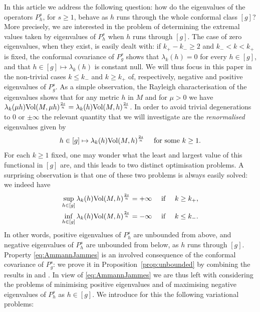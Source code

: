 \documentclass[10pt]{amsart}
\numberwithin{equation}{section}
\def\la{{\lambda}}
\def\Vol{{\mathop{\rm Vol}}}
\theoremstyle{plain}
\theoremstyle{remark}
\begin{document}
\medskip

In this article we address the following question: how do the eigenvalues of the operators $P_h^s$, for $s \ge 1$, behave as $h$ runs through the whole conformal class $[g]$? More precisely, we are interested in the problem of determining the extremal values taken by eigenvalues of $P_h^s$ when $h$ runs through  $[g]$. The case of zero eigenvalues, when they exist, is easily dealt with: if $k_+ - k_- \ge 2$ and $k_- <k < k_+ $ is fixed, the conformal covariance of $P_g^s$ shows that $\lambda_k(h) = 0$ for every $h \in [g]$, and that $h \in [g] \mapsto \lambda_k(h)$ is constant null. We will thus focus in this paper in the non-trivial cases $k \le k_-$ and $k \ge k_+$ of, respectively, negative and positive eigenvalues of $P_g^s$.  As a simple observation, the Rayleigh characterisation of the eigenvalues shows that for any metric $h$ in $M$ and for $\mu >0$ we have $ \la_k(\mu h) \Vol(M,\mu h)^{\frac{2s}{n}} = \la_k(h) \Vol(M, h)^{\frac{2s}{n}}$. In order to avoid trivial degenerations to $0$ or $\pm \infty$ the relevant quantity that we will investigate are the \emph{renormalised} eigenvalues given by
 $$h \in [g] \mapsto \la_k(h) \Vol(M,h)^{\frac{2s}{n}} \quad \text{ for some }  k \ge 1. $$ 
For each $k \ge 1$ fixed, one may wonder what the least and largest value of this functional in $[g]$ are, and this leads to two distinct optimisation problems. A surprising observation is that one of these two problems is always easily solved: we indeed have
\begin{equation} \label{eq:AmmannJammes}
 \begin{aligned}
                            \sup_{h \in [g]} \la_k(h) \Vol(M,h)^{\frac{2s}{n}} = +\infty & \quad  \hbox{ if } &   k \geq k_+,   \\
                             \inf_{h \in [g]} \la_k(h) \Vol(M,h)^{\frac{2s}{n}} = -\infty & \quad \hbox{ if } & k \leq k_- .
                         \end{aligned} 
                           \end{equation}
In other words, positive eigenvalues of $P_h^s$ are unbounded from above, and negative eigenvalues of $P_h^s$ are unbounded from below, as $h$ runs through $[g]$. Property \eqref{eq:AmmannJammes} is an involved consequence of the conformal covariance of $P_g^s$: we prove it in Proposition~\ref{prop:unbounded} by combining the results in \cite{AmmannJammes} and \cite{CaseMalchiodi}. In view of \eqref{eq:AmmannJammes} we are thus left with considering the problems of minimising positive eigenvalues and of maximising negative eigenvalues of $P_h^s$ as  $h \in [g]$. We introduce for this the following variational problems: 
\end{document}
